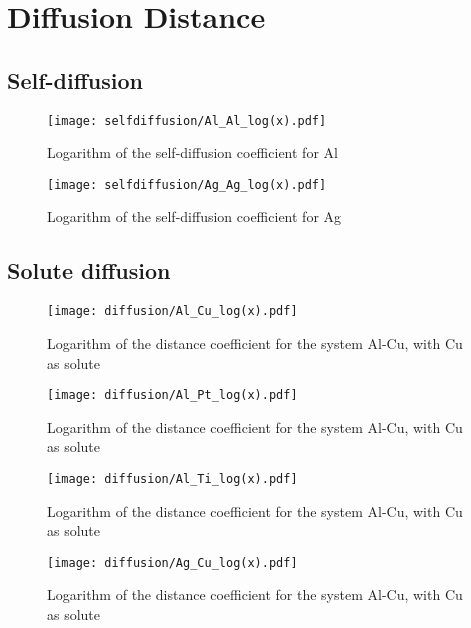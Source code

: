 \newpage
\section{Diffusion Distance}

\subsection{Self-diffusion}

\begin{figure}[h]
    \centering
    \texttt{[image: selfdiffusion/Al\_Al\_log(x).pdf]}
    \caption{Logarithm of the self-diffusion coefficient for Al}
    \label{fig:enter-label}
\end{figure}

\begin{figure}[h]
    \centering
    \texttt{[image: selfdiffusion/Ag\_Ag\_log(x).pdf]}
    \caption{Logarithm of the self-diffusion coefficient for Ag}
    \label{fig:enter-label}
\end{figure}


\subsection{Solute diffusion}

\begin{figure}[h]
    \centering
    \texttt{[image: diffusion/Al\_Cu\_log(x).pdf]}
    \caption{Logarithm of the distance coefficient for the system Al-Cu, with Cu as solute}
    \label{fig:enter-label}
\end{figure}

\begin{figure}[h]
    \centering
    \texttt{[image: diffusion/Al\_Pt\_log(x).pdf]}
    \caption{Logarithm of the distance coefficient for the system Al-Cu, with Cu as solute}
    \label{fig:enter-label}
\end{figure}

\begin{figure}[h]
    \centering
    \texttt{[image: diffusion/Al\_Ti\_log(x).pdf]}
    \caption{Logarithm of the distance coefficient for the system Al-Cu, with Cu as solute}
    \label{fig:enter-label}
\end{figure}



\begin{figure}[h]
    \centering
    \texttt{[image: diffusion/Ag\_Cu\_log(x).pdf]}
    \caption{Logarithm of the distance coefficient for the system Al-Cu, with Cu as solute}
    \label{fig:enter-label}
\end{figure}

